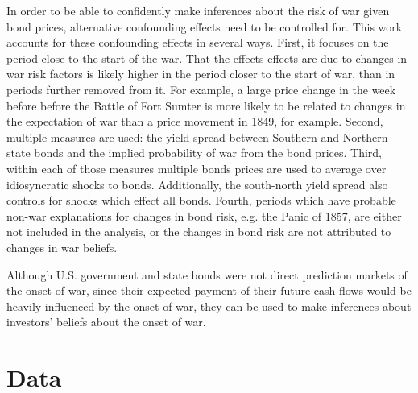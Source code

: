 In order to be able to confidently make inferences about the risk of war given bond prices, alternative confounding effects need to be controlled for.
This work accounts for these confounding effects in several ways.
First, it focuses on the period close to the start of the war.
That the effects effects are due to changes in war risk factors is likely higher in the period closer to the start of war, than in periods further removed from it.
For example, a large price change in the week before before the Battle of Fort Sumter is more likely to be related to changes in the expectation of war than a price movement in 1849, for example.
Second, multiple measures are used: the yield spread between Southern and Northern state bonds and the implied probability of war from the bond prices.
Third, within each of those measures multiple bonds prices are used to average over idiosyncratic shocks to bonds.
Additionally, the south-north yield spread also controls for shocks which effect all bonds.
Fourth, periods which have probable non-war explanations for changes in bond risk, e.g. the Panic of 1857, are either not included in the analysis, or the changes in bond risk are not attributed to changes in war beliefs.

Although U.S. government and state bonds were not direct prediction markets of the onset of war, since their expected payment of their future cash flows would be heavily influenced by the onset of war, they can be used to make inferences about investors' beliefs about the onset of war.

\section{Data}
\label{acw_onset:sec:data}

